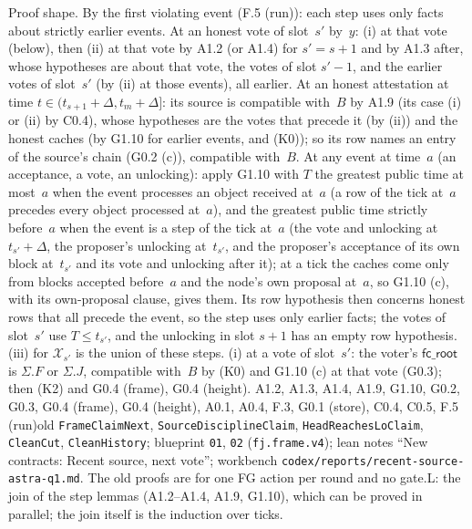 \documentclass{article}
\newcommand{\fcroot}{\mathsf{fc\_root}}
\begin{document}
{Proof shape.  By the first violating event (F.5 (run)): each step uses only facts
about strictly earlier events.  At an honest vote of slot~$s'$ by~$y$: (i) at
that vote (below), then (ii) at that vote by A1.2 (or A1.4) for $s'=s+1$ and by
A1.3 after, whose hypotheses are about that vote, the votes of slot $s'-1$, and
the earlier votes of slot~$s'$ (by (ii) at those events), all earlier.  At an honest attestation at time
$t\in(t_{s+1}+\Delta,t_m+\Delta]$: its source is compatible with~$B$ by A1.9
(its case (i) or (ii) by C0.4), whose hypotheses are the votes that precede it (by (ii)) and the honest
caches (by G1.10 for earlier events, and (K0)); so its row names an entry of
the source's chain (G0.2 (c)), compatible with~$B$.  At any event at time~$a$
(an acceptance, a vote, an unlocking): apply G1.10 with $T$ the greatest
public time at most~$a$ when the event processes an object received at~$a$
(a row of the tick at~$a$ precedes every object processed at~$a$), and the
greatest public time strictly before~$a$ when the event is a step of the tick
at~$a$ (the vote and unlocking at $t_{s'}+\Delta$, the proposer's unlocking
at~$t_{s'}$, and the proposer's acceptance of its own block at~$t_{s'}$ and
its vote and unlocking after it); at a tick the caches come only from blocks
accepted before~$a$ and the node's own proposal at~$a$, so G1.10 (c), with its
own-proposal clause, gives them.  Its row hypothesis then concerns honest
rows that all precede the event, so the step uses only earlier facts; the
votes of slot~$s'$ use $T\leq t_{s'}$, and the unlocking in slot $s+1$ has an
empty row hypothesis.  (iii) for $\mathcal X_{s'}$ is the union
of these steps.  (i) at a vote of slot~$s'$:
the voter's $\fcroot$ is $\Sigma.F$ or $\Sigma.J$, compatible with~$B$ by (K0)
and G1.10 (c) at that vote (G0.3); then (K2) and G0.4 (frame), G0.4 (height).}
{A1.2, A1.3, A1.4, A1.9, G1.10, G0.2, G0.3, G0.4 (frame), G0.4 (height), A0.1, A0.4, F.3, G0.1 (store), C0.4, C0.5, F.5 (run)}{old
\texttt{FrameClaimNext}, \texttt{SourceDisciplineClaim},
\texttt{HeadReachesLoClaim}, \texttt{CleanCut}, \texttt{CleanHistory};
blueprint \texttt{01}, \texttt{02} (\texttt{fj.frame.v4}); lean notes ``New
contracts: Recent source, next vote''; workbench
\nolinkurl{codex/reports/recent-source-astra-q1.md}.  The old proofs are for
one FG action per round and no gate.}{L: the join of the step lemmas
(A1.2--A1.4, A1.9, G1.10), which can be proved in parallel; the join itself
is the induction over ticks.}
\end{document}
